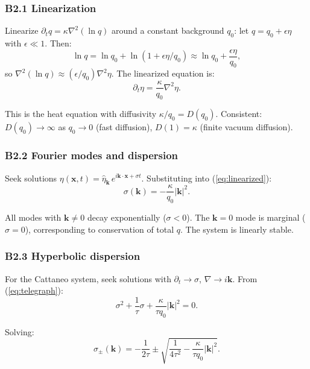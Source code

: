 \documentclass[reprint]{revtex4-2}
\begin{document}
\subsubsection{B2.1 Linearization}

Linearize $\partial_t q = \kappa\nabla^2(\ln q)$ around a constant background $q_0$: let $q = q_0 + \epsilon\eta$ with $\epsilon\ll 1$. Then:
\begin{equation}
\ln q = \ln q_0 + \ln(1 + \epsilon\eta/q_0) \approx \ln q_0 + \frac{\epsilon\eta}{q_0},
\end{equation}
so $\nabla^2(\ln q) \approx (\epsilon/q_0)\nabla^2\eta$. The linearized equation is:
\begin{equation}
\partial_t\eta = \frac{\kappa}{q_0}\nabla^2\eta.
\label{eq:linearized}
\end{equation}

This is the heat equation with diffusivity $\kappa/q_0 = D(q_0)$. Consistent: $D(q_0)\to\infty$ as $q_0\to 0$ (fast diffusion), $D(1)=\kappa$ (finite vacuum diffusion).

\subsubsection{B2.2 Fourier modes and dispersion}

Seek solutions $\eta(\mathbf{x},t) = \hat{\eta}_{\mathbf{k}}\,e^{i\mathbf{k}\cdot\mathbf{x} + \sigma t}$. Substituting into (\ref{eq:linearized}):
\begin{equation}
\sigma(\mathbf{k}) = -\frac{\kappa}{q_0}|\mathbf{k}|^2.
\end{equation}

All modes with $\mathbf{k}\neq 0$ decay exponentially ($\sigma < 0$). The $\mathbf{k}=0$ mode is marginal ($\sigma=0$), corresponding to conservation of total $q$. The system is linearly stable.

\subsubsection{B2.3 Hyperbolic dispersion}

For the Cattaneo system, seek solutions with $\partial_t \to \sigma$, $\nabla \to i\mathbf{k}$. From (\ref{eq:telegraph}):
\begin{equation}
\sigma^2 + \frac{1}{\tau}\sigma + \frac{\kappa}{\tau q_0}|\mathbf{k}|^2 = 0.
\end{equation}

Solving:
\begin{equation}
\sigma_\pm(\mathbf{k}) = -\frac{1}{2\tau} \pm \sqrt{\frac{1}{4\tau^2} - \frac{\kappa}{\tau q_0}|\mathbf{k}|^2}.
\end{equation}
\end{document}
